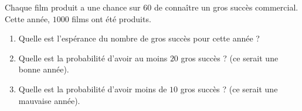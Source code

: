 
\begin{exercice}\label{exosmath-0290}

    Chaque film produit a une chance sur \( 60\) de connaître un gros succès commercial. Cette année, \( 1000\) films ont été produits.

    \begin{enumerate}
        \item
            Quelle est l'espérance du nombre de gros succès pour cette année ?
        \item
            Quelle est la probabilité d'avoir au moins \( 20\) gros succès ? (ce serait une bonne année).
        \item
            Quelle est la probabilité d'avoir moins de \( 10\) gros succès ? (ce serait une mauvaise année). 
    \end{enumerate}

\end{exercice}
